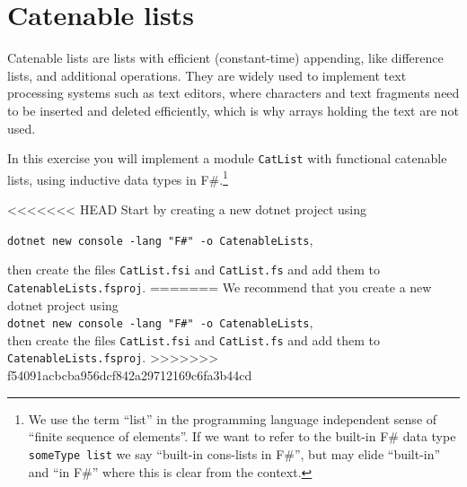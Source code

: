 \section*{Catenable lists}

Catenable lists are lists with efficient (constant-time) appending, like difference lists, and additional operations.  They are widely used to implement text processing systems such as text editors, where characters and text fragments need to be inserted and deleted efficiently, which is why arrays holding the text are not used.

In this exercise you will implement a module \texttt{CatList} with functional catenable lists, using inductive data types in F\#.\footnote{We use the term ``list'' in the programming language independent sense of ``finite sequence of elements''.  If we want to refer to the built-in F\# data type \texttt{someType list} we say ``built-in cons-lists in F\#'', but may elide ``built-in'' and ``in F\#'' where this is clear from the context.}


<<<<<<< HEAD
Start by creating a new dotnet project using 
\begin{center}
\texttt{dotnet new console -lang "F\#" -o CatenableLists},
\end{center} 
then create the files \texttt{CatList.fsi} and \texttt{CatList.fs}
and add them to \texttt{CatenableLists.fsproj}.
=======
We recommend that you create a new dotnet project using \\
\texttt{dotnet new console -lang "F\#" -o CatenableLists}, \\
then create the files \texttt{CatList.fsi} and \texttt{CatList.fs} and add them to \texttt{CatenableLists.fsproj}.
>>>>>>> f54091acbcba956dcf842a29712169c6fa3b44cd

